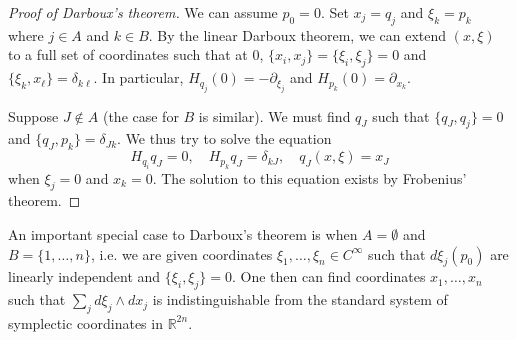 \documentclass[12pt]{report}
\newcommand{\RR}{\mathbb{R}}
\theoremstyle{definition}
\begin{document}
\begin{proof}[Proof of Darboux's theorem]
We can assume $p_0 = 0$. Set $x_j = q_j$ and $\xi_k = p_k$ where $j \in A$ and $k \in B$.
By the linear Darboux theorem, we can extend $(x, \xi)$ to a full set of coordinates such that at $0$, $\{x_i, x_j\} = \{\xi_i, \xi_j\} = 0$ and $\{\xi_k, x_\ell\} = \delta_{k\ell}$.
In particular, $H_{q_j}(0) = -\partial_{\xi_j}$ and $H_{p_k}(0) = \partial_{x_k}$.

Suppose $J \notin A$ (the case for $B$ is similar). We must find $q_J$ such that $\{q_J, q_j\} = 0$ and $\{q_J, p_k\} = \delta_{Jk}$. We thus try to solve the equation
$$H_{q_i}q_J = 0,\quad H_{p_k}q_J = \delta_{kJ},\quad q_J(x, \xi)= x_J$$
when $\xi_j = 0$ and $x_k = 0$.
The solution to this equation exists by Frobenius' theorem.
\end{proof}

An important special case to Darboux's theorem is when $A = \emptyset$ and $B = \{1, \dots, n\}$, i.e. we are given coordinates $\xi_1, \dots, \xi_n \in C^\infty$ such that $d\xi_j(p_0)$ are linearly independent and $\{\xi_i, \xi_j\} = 0$.
One then can find coordinates $x_1, \dots, x_n$ such that $\sum_j d\xi_j \wedge dx_j$ is indistinguishable from the standard system of symplectic coordinates in $\RR^{2n}$.
\end{document}
